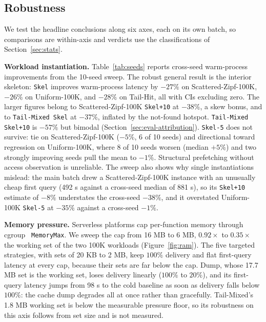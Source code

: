 \documentclass[sigconf, nonacm]{acmart}
\begin{document}
\subsection{Robustness}\label{sec:eval-robustness}

We test the headline conclusions along six axes, each on its own batch, so comparisons are within-axis and verdicts use the classifications of Section~\ref{sec:stats}.

\textbf{Workload instantiation.} Table~\ref{tab:seeds} reports cross-seed warm-process improvements from the 10-seed sweep. The robust general result is the interior skeleton: \texttt{Skel} improves warm-process latency by $-27\%$ on Scattered-Zipf-100K, $-26\%$ on Uniform-100K, and $-28\%$ on Tail-Hit, all with CIs excluding zero. The larger figures belong to Scattered-Zipf-100K \texttt{Skel+10} at $-38\%$, a skew bonus, and to \texttt{Tail-Mixed Skel} at $-37\%$, inflated by the not-found hotspot. \texttt{Tail-Mixed Skel+10} is $-57\%$ but bimodal (Section~\ref{sec:eval-attribution}). \texttt{Skel-5} does not survive: tie on Scattered-Zipf-100K ($-5\%$, 6 of 10 seeds) and directional toward regression on Uniform-100K, where 8 of 10 seeds worsen (median $+5\%$) and two strongly improving seeds pull the mean to $-1\%$. Structural prefetching without access observation is unreliable. The sweep also shows why single instantiations mislead: the main batch drew a Scattered-Zipf-100K instance with an unusually cheap first query (492 \textmu s against a cross-seed median of 881 \textmu s), so its \texttt{Skel+10} estimate of $-8\%$ understates the cross-seed $-38\%$, and it overstated Uniform-100K \texttt{Skel-5} at $-35\%$ against a cross-seed $-1\%$.

\textbf{Memory pressure.} Serverless platforms cap per-function memory through cgroup \texttt{ MemoryMax}. We sweep the cap from 16 MB to 6 MB, $0.92\times$ to $0.35\times$ the working set of the two 100K workloads (Figure~\ref{fig:ram}). The five targeted strategies, with sets of 20 KB to 2 MB, keep $100\%$ delivery and flat first-query latency at every cap, because their sets are far below the cap. Dump, whose 17.7 MB set is the working set, loses delivery linearly ($100\%$ to $20\%$), and its first-query latency jumps from 98 \textmu s to the cold baseline as soon as delivery falls below $100\%$: the cache dump degrades all at once rather than gracefully. Tail-Mixed's 1.8 MB working set is below the measurable pressure floor, so its robustness on this axis follows from set size and is not measured.
\end{document}
